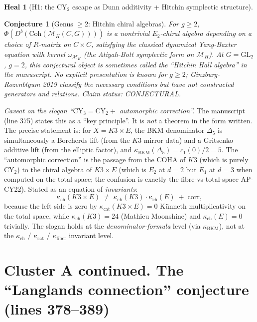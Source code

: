 \documentclass[11pt]{amsart}
\newtheorem{conjecture}[theorem]{Conjecture}
\theoremstyle{definition}
\newtheorem{heal}[attack]{Heal}
\providecommand{\kch}{\kappa_{\mathrm{ch}}}
\providecommand{\kcat}{\kappa_{\mathrm{cat}}}
\providecommand{\kBKM}{\kappa_{\mathrm{BKM}}}
\providecommand{\CY}{\mathrm{CY}}
\providecommand{\Coh}{\mathrm{Coh}}
\providecommand{\Eone}{E_1}
\providecommand{\Etwo}{E_2}
\providecommand{\cM}{\mathcal{M}}
\begin{document}
\begin{heal}[H1: the $\CY_2$ escape as Dunn additivity + Hitchin symplectic structure]
\begin{conjecture}[Genus $\geq 2$: Hitchin chiral algebras]\label{conj:g2-hitchin}
For $g \geq 2$, $\Phi(D^b(\Coh(\cM_H(C,G))))$ is a nontrivial
$\Etwo$-chiral algebra depending on a choice of $R$-matrix on
$C \times C$, satisfying the classical dynamical Yang-Baxter equation
with kernel $\omega_{\cM_H}$ (the Atiyah-Bott symplectic form on
$\cM_H$). At $G = \mathrm{GL}_2$, $g = 2$, this conjectural object is
sometimes called the ``Hitchin Hall algebra'' in the manuscript. No
explicit presentation is known for $g \geq 2$; Ginzburg-Rozenblyum
2019 classify the necessary conditions but have not constructed
generators and relations. \emph{Claim status: CONJECTURAL.}
\end{conjecture}

\noindent\textit{Caveat on the slogan ``$\CY_3 = \CY_2 +$ automorphic
correction''.} The manuscript (line 375) states this as a ``key
principle''. It is {\em not} a theorem in the form written. The
precise statement is: for $X = K3 \times E$, the BKM denominator
$\Delta_5$ is simultaneously a Borcherds lift (from the $K3$ mirror
data) and a Gritsenko additive lift (from the elliptic factor),
and $\kBKM(\Delta_5) = c_1(0)/2 = 5$. The ``automorphic correction''
is the passage from the COHA of $K3$ (which is purely $\CY_2$) to the
chiral algebra of $K3 \times E$ (which is $\Etwo$ at $d = 2$ but
$\Eone$ at $d = 3$ when computed on the total space; the confusion is
exactly the fibre-vs-total-space AP-CY22). Stated as an equation of
{\em invariants}:
\[
 \kch(K3 \times E) \;\neq\; \kch(K3)\cdot \kch(E) \;+\; \text{corr},
\]
because the left side is zero by $\kcat(K3 \times E) = 0$ Künneth
multiplicativity on the total space, while $\kch(K3) = 24$ (Mathieu
Moonshine) and $\kch(E) = 0$ trivially. The slogan holds at the
\emph{denominator-formula} level (via $\kBKM$), not at the
$\kch$ / $\kcat$ / $\kappa_{\mathrm{fiber}}$ invariant level.
\end{heal}

\section{Cluster A continued. The ``Langlands connection'' conjecture (lines 378--389)}
\end{document}
